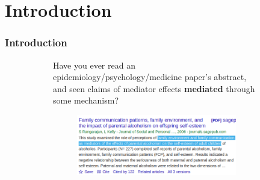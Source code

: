 \documentclass[dvipsnames,handout]{beamer} %
\begin{document}
\section{Introduction}
\begin{frame}
    \frametitle{Introduction}
    \begin{figure}[h!]
        \centering
        \singlespacing
        \begin{subfigure}[c]{\textwidth}
            Have you ever read an epidemiology/psychology/medicine paper's abstract, and seen claims of mediator effects \textbf{mediated} through some mechanism?
        \end{subfigure}
        \begin{subfigure}[c]{0.75\textwidth}
            \centering
            \singlespacing
            \begin{subfigure}[c]{\textwidth}
                \centering
                \includegraphics[width=\textwidth]{presentation-files/headlines/rangarajan-2006.png}
            \end{subfigure}
        \end{subfigure}
    \end{figure}
\end{frame}
\end{document}
